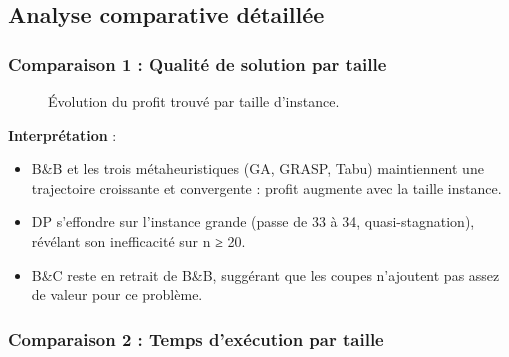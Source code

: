 \documentclass[11pt,a4paper]{article}
\begin{document}
\subsection{Analyse comparative détaillée}

\subsubsection*{Comparaison 1 : Qualité de solution par taille}

\begin{figure}[H]
\centering
{}
\caption{Évolution du profit trouvé par taille d'instance.}
\label{fig:profit-by-size}
\end{figure}

\textbf{Interprétation} :

\begin{itemize}
    \item B\&B et les trois métaheuristiques (GA, GRASP, Tabu) maintiennent une trajectoire croissante et convergente : profit augmente avec la taille instance.
    \item DP s'effondre sur l'instance grande (passe de 33 à 34, quasi-stagnation), révélant son inefficacité sur n ≥ 20.
    \item B\&C reste en retrait de B\&B, suggérant que les coupes n'ajoutent pas assez de valeur pour ce problème.
\end{itemize}

\subsubsection*{Comparaison 2 : Temps d'exécution par taille}
\end{document}
